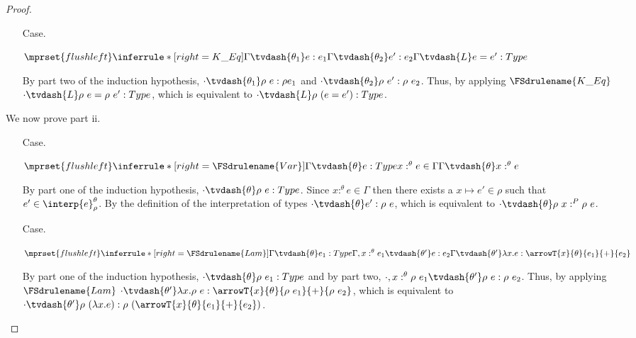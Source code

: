 \begin{proof}
\begin{itemize}
    \item[Case.]\ \\
      \begin{center}
        \begin{math}
          $$\mprset{flushleft}
          \inferrule* [right=K\_Eq] {
            \Gamma \tvdash{\theta_1} e:e_1
            \\\\
            \Gamma \tvdash{\theta_2} e':e_2
          }{\Gamma \tvdash{L} e = e':Type}
        \end{math}
      \end{center}
      By part two of the induction hypothesis, $\cdot \tvdash{\theta_1} \rho\ e:\rho e_1$ and
      $\cdot \tvdash{\theta_2} \rho\ e':\rho\ e_2$.  Thus, by applying $\FSdrulename{K\_Eq}$
      $\cdot \tvdash{L} \rho\ e = \rho\ e':Type$, which is equivalent to
      $\cdot \tvdash{L} \rho\ (e = e'):Type$.
  \end{itemize}
  
  We now prove part ii.
  \begin{itemize}
  \item[Case.] \ \\
    \begin{center}
      \begin{math}
        $$\mprset{flushleft}
        \inferrule* [right=\FSdrulename{Var}]{
          \Gamma \tvdash{\theta} e:Type
          \\\\
          x:^{\theta} e \in \Gamma
        }{\Gamma \tvdash{\theta} x:^{\theta} e}
      \end{math}
    \end{center}
    By part one of the induction hypothesis, $\cdot \tvdash{\theta} \rho\ e:Type$.  Since
    $x:^{\theta} e \in \Gamma$ then there exists a $x \mapsto e' \in \rho$ such that 
    $e' \in \interp{e}^\theta_\rho$.  By the definition of the interpretation of types
    $\cdot \tvdash{\theta} e':\rho\ e$, which is equivalent to 
    $\cdot \tvdash{\theta} \rho\ x:^{P} \rho\ e$.
    

  \item[Case.]\ \\
    \begin{center}
      \begin{math}
        $$\mprset{flushleft}
        \inferrule* [right=\FSdrulename{Lam}] {
          \Gamma \tvdash{\theta} e_1:Type
          \\\\
          \Gamma,x:^{\theta} e_1 \tvdash{\theta'} e:e_2
        }{\Gamma \tvdash{\theta'} 
          \lambda x.e:\arrowT{x}{\theta}{e_1}{+}{e_2}}
      \end{math}
    \end{center}
    By part one of the induction hypothesis, $\cdot \tvdash{\theta} \rho\ e_1:Type$ and
    by part two, $\cdot,x:^{\theta} \rho\ e_1 \tvdash{\theta'} \rho\ e:\rho\ e_2$.  Thus, by
    applying $\FSdrulename{Lam}$ 
    $\cdot \tvdash{\theta'} \lambda x.\rho\ e:\arrowT{x}{\theta}{\rho\ e_1}{+}{\rho\ e_2}$, which
    is equivalent to 
    $\cdot \tvdash{\theta'} \rho\ (\lambda x.e):\rho\ (\arrowT{x}{\theta}{e_1}{+}{e_2})$.


\end{itemize}
\end{proof}
